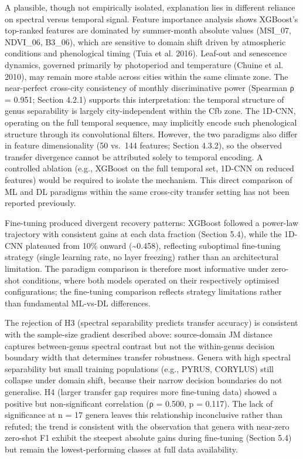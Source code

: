 \documentclass[11pt,a4paper]{scrartcl}
\begin{document}
A plausible, though not empirically isolated, explanation lies in
different reliance on spectral versus temporal signal. Feature
importance analysis shows XGBoost's top-ranked features are dominated by
summer-month absolute values (MSI\_07, NDVI\_06, B3\_06), which are
sensitive to domain shift driven by atmospheric conditions and
phenological timing (Tuia et al. 2016). Leaf-out and senescence
dynamics, governed primarily by photoperiod and temperature (Chuine et
al. 2010), may remain more stable across cities within the same climate
zone. The near-perfect cross-city consistency of monthly discriminative
power (Spearman ρ = 0.951; Section 4.2.1) supports this interpretation:
the temporal structure of genus separability is largely city-independent
within the Cfb zone. The 1D-CNN, operating on the full temporal
sequence, may implicitly encode such phenological structure through its
convolutional filters. However, the two paradigms also differ in feature
dimensionality (50 vs.~144 features; Section 4.3.2), so the observed
transfer divergence cannot be attributed solely to temporal encoding. A
controlled ablation (e.g., XGBoost on the full temporal set, 1D-CNN on
reduced features) would be required to isolate the mechanism. This
direct comparison of ML and DL paradigms within the same cross-city
transfer setting has not been reported previously.

Fine-tuning produced divergent recovery patterns: XGBoost followed a
power-law trajectory with consistent gains at each data fraction
(Section 5.4), while the 1D-CNN plateaued from 10\% onward
(\textasciitilde0.458), reflecting suboptimal fine-tuning strategy
(single learning rate, no layer freezing) rather than an architectural
limitation. The paradigm comparison is therefore most informative under
zero-shot conditions, where both models operated on their respectively
optimised configurations; the fine-tuning comparison reflects strategy
limitations rather than fundamental ML-vs-DL differences.

The rejection of H3 (spectral separability predicts transfer accuracy)
is consistent with the sample-size gradient described above:
source-domain JM distance captures between-genus spectral contrast but
not the within-genus decision boundary width that determines transfer
robustness. Genera with high spectral separability but small training
populations (e.g., PYRUS, CORYLUS) still collapse under domain shift,
because their narrow decision boundaries do not generalise. H4 (larger
transfer gap requires more fine-tuning data) showed a positive but
non-significant correlation (ρ = 0.500, p = 0.117). The lack of
significance at n = 17 genera leaves this relationship inconclusive
rather than refuted; the trend is consistent with the observation that
genera with near-zero zero-shot F1 exhibit the steepest absolute gains
during fine-tuning (Section 5.4) but remain the lowest-performing
classes at full data availability.
\end{document}
